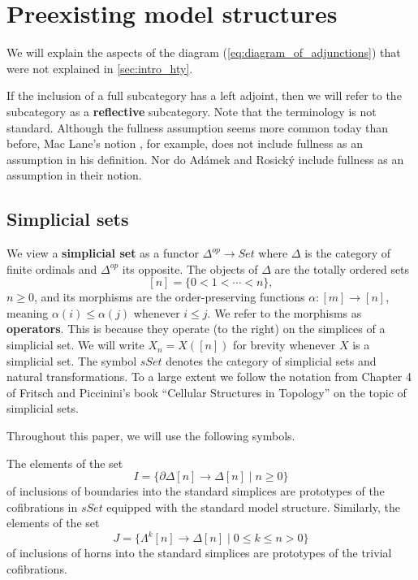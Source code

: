 
\section{Preexisting model structures}
\label{sec:pre_exist}


We will explain the aspects of the diagram (\ref{eq:diagram_of_adjunctions}) that were not explained in \cref{sec:intro_hty}.

If the inclusion of a full subcategory has a left adjoint, then we will refer to the subcategory as a \textbf{reflective} subcategory. Note that the terminology is not standard. Although the fullness assumption seems more common today than before, Mac Lane's notion \cite{ML98}, for example, does not include fullness as an assumption in his definition. Nor do Adámek and Rosický \cite{AR15} include fullness as an assumption in their notion.


\subsection{Simplicial sets}

We view a \textbf{simplicial set} as a functor $\Delta ^{op}\to Set$ where $\Delta$ is the category of finite ordinals and $\Delta ^{op}$ its opposite. The objects of $\Delta$ are the totally ordered sets
\[[n]=\{ 0<1<\cdots <n\} ,\]
$n\geq 0$, and its morphisms are the order-preserving functions $\alpha :[m]\to [n]$, meaning $\alpha (i)\leq \alpha (j)$ whenever $i\leq j$. We refer to the morphisms as \textbf{operators}. This is because they operate (to the right) on the simplices of a simplicial set. We will write $X_n=X([n])$ for brevity whenever $X$ is a simplicial set. The symbol $sSet$ denotes the category of simplicial sets and natural transformations. To a large extent we follow the notation from Chapter 4 of Fritsch and Piccinini's book ``Cellular Structures in Topology'' \cite{FP90} on the topic of simplicial sets.

Throughout this paper, we will use the following symbols.
\begin{notation}\label{not:prototypes_cofibr_trivial_cofibr_standard_pre_exist}
The elements of the set
\[I=\{\partial \Delta [n]\to \Delta [n]\mid n\geq 0\}\]
of inclusions of boundaries into the standard simplices are prototypes of the cofibrations in $sSet$ equipped with the standard model structure. Similarly, the elements of the set
\[J=\{\Lambda ^k[n]\to \Delta [n]\mid 0\leq k\leq n>0\}\]
of inclusions of horns into the standard simplices are prototypes of the trivial cofibrations.
\end{notation}

